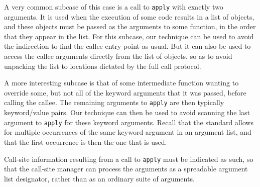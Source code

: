 A very common subcase of this case is a call to \texttt{apply} with
exactly two arguments.  It is used when the execution of some code
results in a list of objects, and these objects must be passed as the
arguments to some function, in the order that they appear in the
list.  For this subcase, our technique can be used to avoid the
indirection to find the callee entry point as usual.  But it can also
be used to access the callee arguments directly from the list of
objects, so as to avoid unpacking the list to locations dictated by
the full call protocol.

A more interesting subcase is that of some intermediate function
wanting to override some, but not all of the keyword arguments that it
was passed, before calling the callee.  The remaining arguments to
\texttt{apply} are then typically keyword/value pairs.  Our technique
can then be used to avoid scanning the last argument to \texttt{apply}
for these keyword arguments.  Recall that the standard allows for
multiple occurrences of the same keyword argument in an argument list,
and that the first occurrence is then the one that is used.

Call-site information resulting from a call to \texttt{apply} must be
indicated as such, so that the call-site manager can process the
arguments as a spreadable argument list designator, rather than as an
ordinary suite of arguments.

